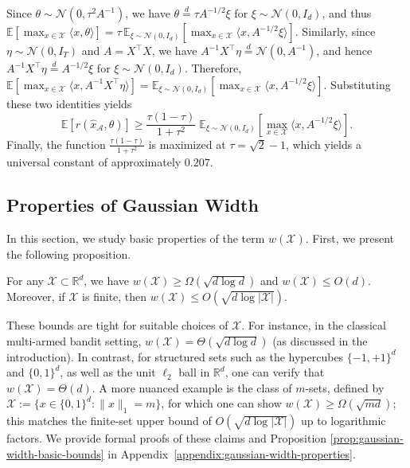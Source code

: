 Since $\theta\sim\mathcal N(0,\tau^2A^{-1})$, we have $\theta\stackrel{d}{=}\tau A^{-1/2}\xi$ for $\xi\sim\mathcal N(0,I_d)$, and thus $\mathbb{E}\!\left[\max_{x\in\mathcal X}\langle x,\theta\rangle\right]=\tau\,\mathbb{E}_{\xi\sim\mathcal N(0,I_d)}\!\left[\max_{x\in\mathcal X}\langle x,A^{-1/2}\xi\rangle\right]$.
Similarly, since $\eta\sim\mathcal N(0,I_T)$ and $A=X^\top X$, we have $A^{-1}X^\top\eta\stackrel{d}{=}\mathcal N(0,A^{-1})$, and hence $A^{-1}X^\top\eta\stackrel{d}{=}A^{-1/2}\xi$ for $\xi\sim\mathcal N(0,I_d)$.
Therefore, $\mathbb{E}\!\left[\max_{x\in\mathcal X}\langle x,A^{-1}X^\top\eta\rangle\right]=\mathbb{E}_{\xi\sim\mathcal N(0,I_d)}\!\left[\max_{x\in\mathcal X}\langle x,A^{-1/2}\xi\rangle\right]$.
Substituting these two identities yields
\[
\mathbb{E}[r(\hat x_{\mathcal A},\theta)]
\ge
\frac{\tau(1-\tau)}{1+\tau^2}\;
\mathbb{E}_{\xi\sim\mathcal N(0,I_d)}
\!\left[\max_{x\in\mathcal X}\langle x,A^{-1/2}\xi\rangle\right].
\]
Finally, the function $\frac{\tau(1-\tau)}{1+\tau^2}$ is maximized at $\tau=\sqrt{2}-1$, which yields a universal constant of approximately $0.207$.



\subsection{Properties of Gaussian Width}\label{sec:properties-gaussian}
In this section, we study basic properties of the term $w(\mathcal{X})$. First, we present the following proposition.

\begin{proposition}\label{prop:gaussian-width-basic-bounds}
For any $\mathcal{X}\subset \mathbb{R}^d$, we have $w(\mathcal{X}) \ge \Omega(\sqrt{d\log d})$ and $w(\mathcal{X}) \le O(d)$.
Moreover, if $\mathcal{X}$ is finite, then $w(\mathcal{X}) \le O(\sqrt{d\log|\mathcal{X}|})$.
\end{proposition}

These bounds are tight for suitable choices of $\mathcal{X}$.
For instance, in the classical multi-armed bandit setting, $w(\mathcal{X})=\Theta(\sqrt{d\log d})$ (as discussed in the introduction).
In contrast, for structured sets such as the hypercubes $\{-1,+1\}^d$ and $\{0,1\}^d$, as well as the unit $\ell_2$ ball in $\mathbb{R}^d$, one can verify that $w(\mathcal{X})=\Theta(d)$.
A more nuanced example is the class of $m$-sets, defined by $\mathcal{X}:=\{x\in\{0,1\}^d:\|x\|_1=m\}$, for which one can show $w(\mathcal{X})\ge \Omega(\sqrt{md})$; this matches the finite-set upper bound of $O(\sqrt{d \log |\mathcal{X}|})$ up to logarithmic factors.
We provide formal proofs of these claims and Proposition \ref{prop:gaussian-width-basic-bounds} in Appendix~\ref{appendix:gaussian-width-properties}.



